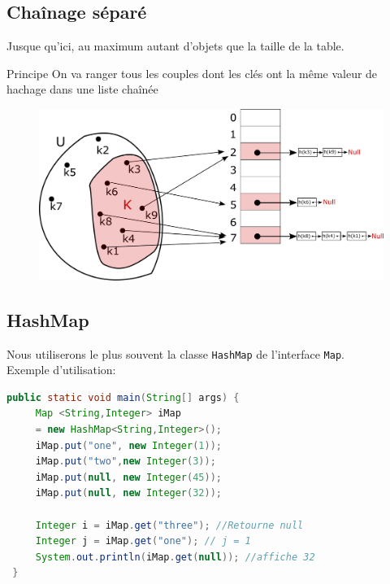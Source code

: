 \documentclass[12pt,a4paper]{beamer}
\begin{document}
\subsection{Chaînage séparé}
\begin{frame}
Jusque qu'ici, au maximum autant d'objets que la taille de la table.
\begin{block}{Principe}
On va ranger tous les couples dont les clés ont la même valeur de hachage dans une liste chaînée 
\end{block}
\end{frame}
\begin{frame}
\begin{figure}
\includegraphics[scale=0.35]{figs/ht_chaining}
\end{figure}
\end{frame}

\begin{frame}
\tableofcontents
\end{frame}

\subsection{HashMap}

\begin{frame}[fragile]
Nous utiliserons le plus souvent la classe \texttt{HashMap} de l'interface \texttt{Map}.\\
Exemple d'utilisation:

\begin{lstlisting}[language=Java]
 public static void main(String[] args) {
     Map <String,Integer> iMap 
     = new HashMap<String,Integer>();
     iMap.put("one", new Integer(1));
     iMap.put("two",new Integer(3));
     iMap.put(null, new Integer(45));
     iMap.put(null, new Integer(32));
		
     Integer i = iMap.get("three"); //Retourne null
     Integer j = iMap.get("one"); // j = 1
     System.out.println(iMap.get(null)); //affiche 32
 }
\end{lstlisting}

\end{frame}
\end{document}
